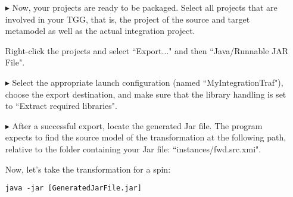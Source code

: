 \begin{itemize}
\item[$\blacktriangleright$]
Now, your projects are ready to be packaged.
Select all projects that are involved in your TGG, that is, the project of the source and target metamodel as well as the actual integration project.

Right-click the projects and select ``Export..." and then ``Java/Runnable JAR File".

\item[$\blacktriangleright$]
Select the appropriate launch configuration (named ``MyIntegrationTraf"), choose the export destination, and make sure that the library handling is set to ``Extract required libraries".

\item[$\blacktriangleright$]
After a successful export, locate the generated Jar file.
The program expects to find the source model of the transformation at the following path, relative to the folder containing your Jar file: ``instances/fwd.src.xmi".

Now, let's take the transformation for a spin:
\begin{lstlisting}
java -jar [GeneratedJarFile.jar]
\end{lstlisting}

\end{itemize}



   
